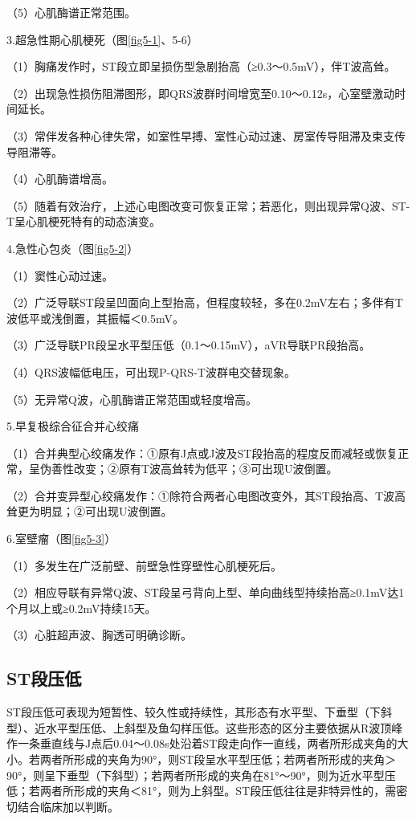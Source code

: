 （5）心肌酶谱正常范围。

3.超急性期心肌梗死（图\ref{fig5-1}、5-6）

（1）胸痛发作时，ST段立即呈损伤型急剧抬高（≥0.3～0.5mV），伴T波高耸。

（2）出现急性损伤阻滞图形，即QRS波群时间增宽至0.10～0.12s，心室壁激动时间延长。

（3）常伴发各种心律失常，如室性早搏、室性心动过速、房室传导阻滞及束支传导阻滞等。

（4）心肌酶谱增高。

（5）随着有效治疗，上述心电图改变可恢复正常；若恶化，则出现异常Q波、ST-T呈心肌梗死特有的动态演变。

4.急性心包炎（图\ref{fig5-2}）

（1）窦性心动过速。

（2）广泛导联ST段呈凹面向上型抬高，但程度较轻，多在0.2mV左右；多伴有T波低平或浅倒置，其振幅＜0.5mV。

（3）广泛导联PR段呈水平型压低（0.1～0.15mV），aVR导联PR段抬高。

（4）QRS波幅低电压，可出现P-QRS-T波群电交替现象。

（5）无异常Q波，心肌酶谱正常范围或轻度增高。

5.早复极综合征合并心绞痛

（1）合并典型心绞痛发作：①原有J点或J波及ST段抬高的程度反而减轻或恢复正常，呈伪善性改变；②原有T波高耸转为低平；③可出现U波倒置。

（2）合并变异型心绞痛发作：①除符合两者心电图改变外，其ST段抬高、T波高耸更为明显；②可出现U波倒置。

6.室壁瘤（图\ref{fig5-3}）

（1）多发生在广泛前壁、前壁急性穿壁性心肌梗死后。

（2）相应导联有异常Q波、ST段呈弓背向上型、单向曲线型持续抬高≥0.1mV达1个月以上或≥0.2mV持续15天。

（3）心脏超声波、胸透可明确诊断。

\protect\hypertarget{text00011.htmlux5cux23subid80}{}{}

\subsection{ST段压低}

ST段压低可表现为短暂性、较久性或持续性，其形态有水平型、下垂型（下斜型）、近水平型压低、上斜型及鱼勾样压低。这些形态的区分主要依据从R波顶峰作一条垂直线与J点后0.04～0.08s处沿着ST段走向作一直线，两者所形成夹角的大小。若两者所形成的夹角为90°，则ST段呈水平型压低；若两者所形成的夹角＞90°，则呈下垂型（下斜型）；若两者所形成的夹角在81°～90°，则为近水平型压低；若两者所形成的夹角＜81°，则为上斜型。ST段压低往往是非特异性的，需密切结合临床加以判断。

